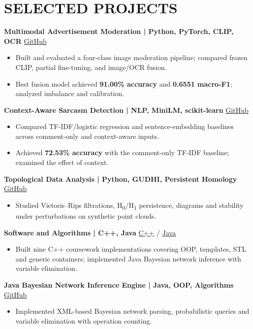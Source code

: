 \documentclass[10pt,a4paper]{article}
\begin{document}
\section*{SELECTED PROJECTS}
\textbf{Multimodal Advertisement Moderation \quad | \quad Python, PyTorch, CLIP, OCR} \hfill \href{https://github.com/naamaskital/sVLM_ads_project}{GitHub}
\begin{itemize}
\item Built and evaluated a four-class image moderation pipeline; compared frozen CLIP, partial fine-tuning, and image/OCR fusion.
\item Best fusion model achieved \textbf{91.00\% accuracy} and \textbf{0.6551 macro-F1}; analyzed imbalance and calibration.
\end{itemize}
\textbf{Context-Aware Sarcasm Detection \quad | \quad NLP, MiniLM, scikit-learn} \hfill \href{https://github.com/naamaskital/sarcasm_context_project}{GitHub}
\begin{itemize}
\item Compared TF-IDF/logistic regression and sentence-embedding baselines across comment-only and context-aware inputs.
\item Achieved \textbf{72.53\% accuracy} with the comment-only TF-IDF baseline; examined the effect of context.
\end{itemize}
\textbf{Topological Data Analysis \quad | \quad Python, GUDHI, Persistent Homology} \hfill \href{https://github.com/naamaskital/topological-data-analysis}{GitHub}
\begin{itemize}
\item Studied Vietoris--Rips filtrations, H\textsubscript{0}/H\textsubscript{1} persistence, diagrams and stability under perturbations on synthetic point clouds.
\end{itemize}
\textbf{Software and Algorithms \quad | \quad C++, Java} \hfill \href{https://github.com/naamaskital/cpp-programming-projects}{C++} / \href{https://github.com/naamaskital/bayesian-network-inference-java}{Java}
\begin{itemize}
\item Built nine C++ coursework implementations covering OOP, templates, STL and generic containers; implemented Java Bayesian network inference with variable elimination.
\end{itemize}
\textbf{Java Bayesian Network Inference Engine \quad | \quad Java, OOP, Algorithms} \hfill \href{https://github.com/naamaskital/bayesian-network-inference-java}{GitHub}
\begin{itemize}
\item Implemented XML-based Bayesian network parsing, probabilistic queries and variable elimination with operation counting.
\end{itemize}
\end{document}
